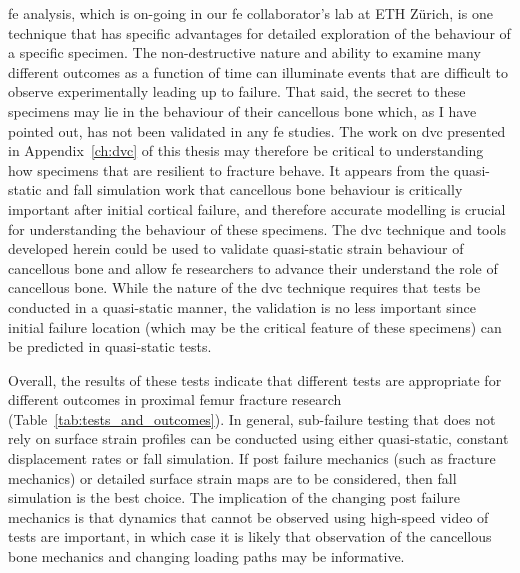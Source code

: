 \ac{fe} analysis, which is on-going in our \ac{fe} collaborator's lab at ETH Z\"urich, is one technique that has specific advantages for detailed exploration of the behaviour of a specific specimen.
The non-destructive nature and ability to examine many different outcomes as a function of time can illuminate events that are difficult to observe experimentally leading up to failure.
That said, the secret to these specimens may lie in the behaviour of their cancellous bone which, as I have pointed out, has not been validated in any \ac{fe} studies.
The work on \acf{dvc} presented in Appendix~\ref{ch:dvc} of this thesis may therefore be critical to understanding how specimens that are resilient to fracture behave.
It appears from the quasi-static and fall simulation work that cancellous bone behaviour is critically important after initial cortical failure, and therefore accurate modelling is crucial for understanding the behaviour of these specimens.
The \ac{dvc} technique and tools developed herein could be used to validate quasi-static strain behaviour of cancellous bone and allow \ac{fe} researchers to advance their understand the role of cancellous bone.
While the nature of the \ac{dvc} technique requires that tests be conducted in a quasi-static manner, the validation is no less important since initial failure location (which may be the critical feature of these specimens) can be predicted in quasi-static tests.

Overall, the results of these tests indicate that different tests are appropriate for different outcomes in proximal femur fracture research (Table~\ref{tab:tests_and_outcomes}).
In general, sub-failure testing that does not rely on surface strain profiles can be conducted using either quasi-static, constant displacement rates or fall simulation.
If post failure mechanics (such as fracture mechanics) or detailed surface strain maps are to be considered, then fall simulation is the best choice.
The implication of the changing post failure mechanics is that dynamics that cannot be observed using high-speed video of tests are important, in which case it is likely that observation of the cancellous bone mechanics and changing loading paths may be informative.


